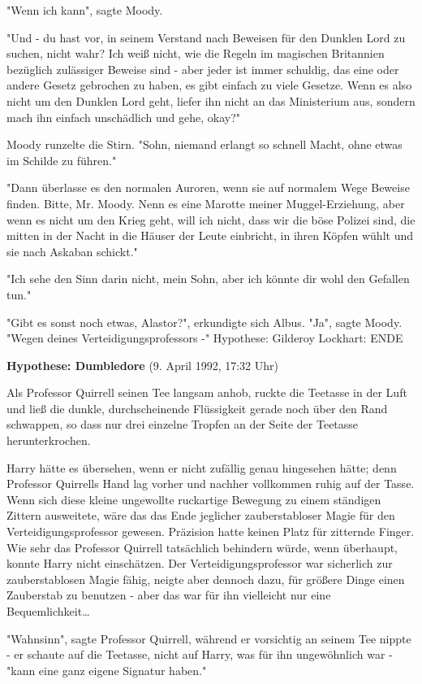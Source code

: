 {"Wenn ich kann", sagte Moody.

"Und - du hast vor, in seinem Verstand nach Beweisen für den Dunklen Lord zu suchen, nicht wahr? Ich weiß nicht, wie die Regeln im magischen Britannien bezüglich zulässiger Beweise sind - aber jeder ist immer schuldig, das eine oder andere Gesetz gebrochen zu haben, es gibt einfach zu viele Gesetze. Wenn es also nicht um den Dunklen Lord geht, liefer ihn nicht an das Ministerium aus, sondern mach ihn einfach unschädlich und gehe, okay?"

Moody runzelte die Stirn. "Sohn, niemand erlangt so schnell Macht, ohne etwas im Schilde zu führen."

"Dann überlasse es den normalen Auroren, wenn sie auf normalem Wege Beweise finden. Bitte, Mr. Moody. Nenn es eine Marotte meiner Muggel-Erziehung, aber wenn es nicht um den Krieg geht, will ich nicht, dass wir die böse Polizei sind, die mitten in der Nacht in die Häuser der Leute einbricht, in ihren Köpfen wühlt und sie nach Askaban schickt."

"Ich sehe den Sinn darin nicht, mein Sohn, aber ich könnte dir wohl den Gefallen tun."

"Gibt es sonst noch etwas, Alastor?", erkundigte sich Albus. "Ja", sagte Moody. "Wegen deines Verteidigungsprofessors -" Hypothese: Gilderoy Lockhart: ENDE

\textbf{Hypothese: Dumbledore} (9. April 1992, 17:32 Uhr)

Als Professor Quirrell seinen Tee langsam anhob, ruckte die Teetasse in der Luft und ließ die dunkle, durchscheinende Flüssigkeit gerade noch über den Rand schwappen, so dass nur drei einzelne Tropfen an der Seite der Teetasse herunterkrochen.

Harry hätte es übersehen, wenn er nicht zufällig genau hingesehen hätte; denn Professor Quirrells Hand lag vorher und nachher vollkommen ruhig auf der Tasse. Wenn sich diese kleine ungewollte ruckartige Bewegung zu einem ständigen Zittern ausweitete, wäre das das Ende jeglicher zauberstabloser Magie für den Verteidigungsprofessor gewesen. Präzision hatte keinen Platz für zitternde Finger. Wie sehr das Professor Quirrell tatsächlich behindern würde, wenn überhaupt, konnte Harry nicht einschätzen. Der Verteidigungsprofessor war sicherlich zur zauberstablosen Magie fähig, neigte aber dennoch dazu, für größere Dinge einen Zauberstab zu benutzen - aber das war für ihn vielleicht nur eine Bequemlichkeit…

"Wahnsinn", sagte Professor Quirrell, während er vorsichtig an seinem Tee nippte - er schaute auf die Teetasse, nicht auf Harry, was für ihn ungewöhnlich war - "kann eine ganz eigene Signatur haben."

}
